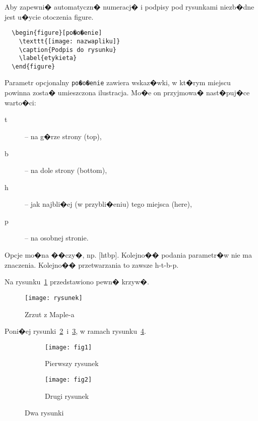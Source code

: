 \documentclass[11pt,wide]{mwart}
\begin{document}
Aby zapewni� automatyczn� numeracj� i podpisy pod rysunkami niezb�dne jest u�ycie otoczenia
\textsf{figure}.
\begin{verbatim}
  \begin{figure}[po�o�enie]
    \texttt{[image: nazwapliku]}
    \caption{Podpis do rysunku}
    \label{etykieta}
  \end{figure}
\end{verbatim}
Parametr opcjonalny \texttt{po�o�enie} zawiera wskaz�wki, w kt�rym miejscu powinna
zosta� umieszczona ilustracja. Mo�e on przyjmowa� nast�puj�ce warto�ci:
\begin{description}
\item[t] -- na g�rze strony (top),
\item[b] -- na dole strony (bottom),
\item[h] -- jak najbli�ej (w przybli�eniu) tego miejsca (here),
\item[p] -- na osobnej stronie.
\end{description}

Opcje mo�na ��czy�, np. [htbp]. Kolejno�� podania parametr�w nie ma znaczenia. Kolejno�� przetwarzania to zawsze h-t-b-p.

\noindent Na rysunku~\ref{fig:rysunek} przedstawiono pewn� krzyw�.
\begin{figure}[ht]
  \begin{center}
  \texttt{[image: rysunek]}
  \end{center}
  \caption{Zrzut z \textsf{Maple-a}}
  \label{fig:rysunek}
\end{figure}

\noindent Poni�ej rysunki~\ref{fig:1}~i~\ref{fig:2}, w ramach rysunku~\ref{fig:fig3}.

\newpage
\begin{figure}[ht]
        \centering
        \begin{subfigure}[ht]{0.44\textwidth}
                \texttt{[image: fig1]}
                \caption{Pierwszy rysunek}
                \label{fig:1}
        \end{subfigure}%
        \begin{subfigure}[ht]{0.44\textwidth}
                \texttt{[image: fig2]}
                \caption{Drugi rysunek}
                \label{fig:2}
        \end{subfigure}
        \caption{Dwa rysunki}\label{fig:fig3}
\end{figure}

\end{document}
